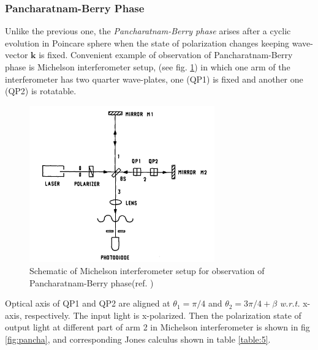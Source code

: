 \documentclass[11pt,a4paper]{article}
\numberwithin{equation}{section}
\begin{document}
\subsubsection{Pancharatnam-Berry Phase}
Unlike the previous one, the \textit{Pancharatnam-Berry phase} arises after a cyclic evolution in Poincare sphere when the state of polarization changes  keeping wave-vector $\boldsymbol{k}$ is fixed. Convenient example of observation of Pancharatnam-Berry phase is Michelson interferometer setup, (see fig. \ref{fig:pb expt}) in which one arm of the interferometer has two quarter wave-plates, one (QP1) is fixed and another one (QP2) is rotatable. \cite{chyba 88}

\begin{figure}[H]
	\centering
	\includegraphics[width=8cm]{pb expt.png}
	\caption{Schematic of Michelson interferometer setup for observation of Pancharatnam-Berry phase(ref. \cite{chyba 88})}
	\label{fig:pb expt}
\end{figure}

 Optical axis of QP1 and QP2 are aligned at $\theta_1= \pi/4$ and $\theta_2=3\pi/4 + \beta$ \textit{w.r.t.} x-axis, respectively. The input light is x-polarized. Then the polarization state of output light at different part of arm 2 in Michelson interferometer is shown in fig \ref{fig:pancha}, and corresponding Jones calculus shown in table \ref{table:5}.
 
\end{document}
